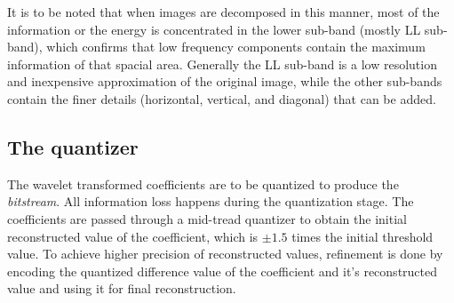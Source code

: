 \documentclass[./A14_Report.tex]{subfiles}
\begin{document}
It is to be noted that when images are decomposed in this manner, most of the
information or the energy is concentrated in the lower sub-band (mostly LL
sub-band), which confirms that low frequency components contain the maximum
information of that spacial area. Generally the LL sub-band is a low resolution
and inexpensive approximation of the original image, while the other sub-bands
contain the finer details (horizontal, vertical, and diagonal) that can be
added.

\subsection{The quantizer}
\label{sec:the_quantizer}

The wavelet transformed coefficients are to be quantized to produce the
\textit{bitstream}. All information loss happens during the quantization
stage. The coefficients are passed through a mid-tread quantizer to obtain the
initial reconstructed value of the coefficient, which is $\pm 1.5$ times the
initial threshold value. To achieve higher precision of reconstructed values,
refinement is done by encoding the quantized difference value of the
coefficient and it's reconstructed value and using it for final reconstruction.
\end{document}
